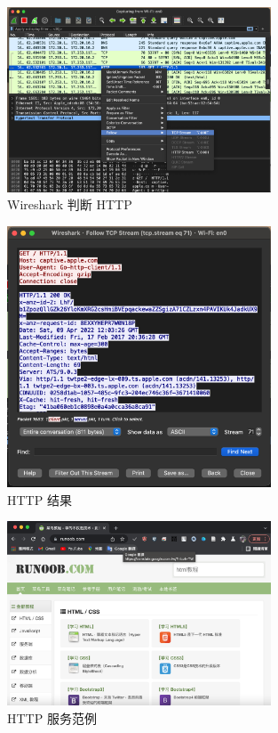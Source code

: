 \begin{figure}[htb]
\centering 
\includegraphics[width=0.70\textwidth]{img/ch1s4m7.png} 
\caption{Wireshark 判断 HTTP}
\label{Test}
\end{figure}

\begin{figure}[htb]
\centering 
\includegraphics[width=0.70\textwidth]{img/ch1s4m8.png} 
\caption{HTTP 结果}
\label{Test}
\end{figure}

\begin{figure}[htb]
\centering 
\includegraphics[width=0.70\textwidth]{img/ch1s4m9.png} 
\caption{HTTP 服务范例}
\label{Test}
\end{figure}


